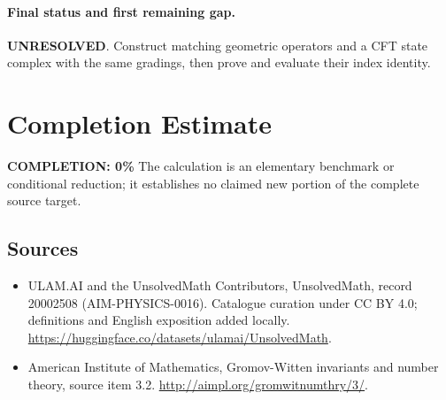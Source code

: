 \documentclass[11pt]{article}
\begin{document}
\paragraph{Final status and first remaining gap.}
\textbf{UNRESOLVED}. Construct matching geometric operators and a CFT state complex with the same gradings, then prove and evaluate their index identity.

\section{Completion Estimate}
\noindent\textbf{COMPLETION: 0\%}
The calculation is an elementary benchmark or conditional reduction; it establishes no claimed new portion of the complete source target.

\subsection{Sources}
\begin{itemize}
\item[\hypertarget{source:20002508:1}{S1}] ULAM.AI and the UnsolvedMath Contributors, UnsolvedMath, record 20002508 (AIM-PHYSICS-0016). Catalogue curation under CC BY 4.0; definitions and English exposition added locally.
\url{https://huggingface.co/datasets/ulamai/UnsolvedMath}.
\item[\hypertarget{source:20002508:2}{S2}] American Institute of Mathematics, Gromov-Witten invariants and number theory, source item 3.2.
\url{http://aimpl.org/gromwitnumthry/3/}.
\end{itemize}
\label{end:20002508}
\end{document}
